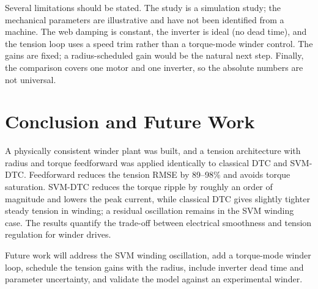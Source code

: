 \documentclass[12pt,a4paper,onecolumn]{IEEEtran}
\begin{document}
Several limitations should be stated. The study is a simulation study; the mechanical parameters are illustrative and have not been identified from a machine. The web damping is constant, the inverter is ideal (no dead time), and the tension loop uses a speed trim rather than a torque-mode winder control. The gains are fixed; a radius-scheduled gain would be the natural next step. Finally, the comparison covers one motor and one inverter, so the absolute numbers are not universal.

\section{Conclusion and Future Work}\label{sec:concl}
A physically consistent winder plant was built, and a tension architecture with radius and torque feedforward was applied identically to classical DTC and SVM-DTC. Feedforward reduces the tension RMSE by 89--98\% and avoids torque saturation. SVM-DTC reduces the torque ripple by roughly an order of magnitude and lowers the peak current, while classical DTC gives slightly tighter steady tension in winding; a residual oscillation remains in the SVM winding case. The results quantify the trade-off between electrical smoothness and tension regulation for winder drives.

Future work will address the SVM winding oscillation, add a torque-mode winder loop, schedule the tension gains with the radius, include inverter dead time and parameter uncertainty, and validate the model against an experimental winder.



\end{document}
